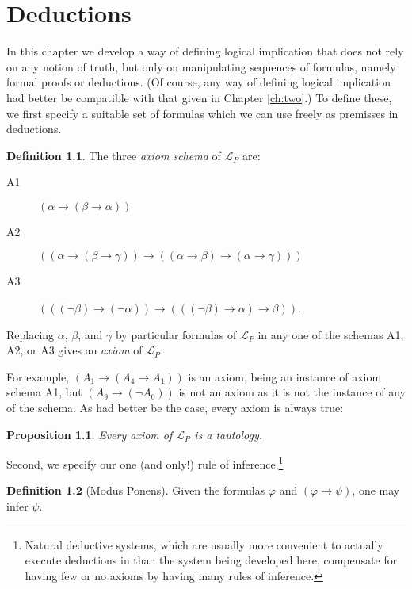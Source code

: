 \documentclass[12pt]{amsbook}
\theoremstyle{plain}
\newtheorem{prop}[thm]{Proposition}
\theoremstyle{definition}
\newtheorem{defn}{Definition}[chapter]
\theoremstyle{remark}
\begin{document}
%
%

\chapter{Deductions} \label{ch:three}

In this chapter we develop a way of defining logical implication that does not rely on any notion of truth,  but only on manipulating sequences of formulas,  namely formal proofs or deductions.  (Of course,  any way of defining logical implication had better be compatible with that given in Chapter \ref{ch:two}.) To define these,  we first specify a suitable set of formulas which we can use freely as premisses in deductions.

\begin{defn}     
The three {\em axiom schema\/} of $\mathcal{L}_P$ are:
\begin{description}
\item[A1] $(\alpha \to (\beta \to \alpha))$
\item[A2] $((\alpha \to (\beta \to \gamma)) \to ((\alpha \to \beta) \to
(\alpha \to \gamma)))$
\item[A3] $(((\lnot\beta)\to (\lnot\alpha)) \to ( ((\lnot\beta) \to \alpha) \to \beta ) )$.
\end{description}
Replacing $\alpha$,  $\beta$,  and $\gamma$ by particular formulas of $\mathcal{L}_P$ in any one of the schemas A1,  A2,  or A3 gives an {\em axiom\/} of $\mathcal{L}_P$.
\end{defn}

For example,  $(A_1 \to (A_4 \to A_1))$ is an axiom,  being an instance of axiom schema A1,  but $(A_9 \to (\lnot A_0))$ is not an axiom as it is not the instance of any of the schema.  As had better be the case,  every axiom is always true:

\begin{prop} \label{p:axta}
Every axiom of $\mathcal{L}_P$ is a tautology.
\end{prop}

Second,  we specify our one (and only!) rule of inference.\footnote{Natural deductive systems,  which are usually more convenient to actually execute deductions in than the system being developed here,  compensate for having few or no axioms by having many rules of inference.}

\begin{defn}[Modus Ponens] 
Given the formulas $\varphi$ and $(\varphi \to \psi)$,  one may infer $\psi$.
\end{defn}
\end{document}
